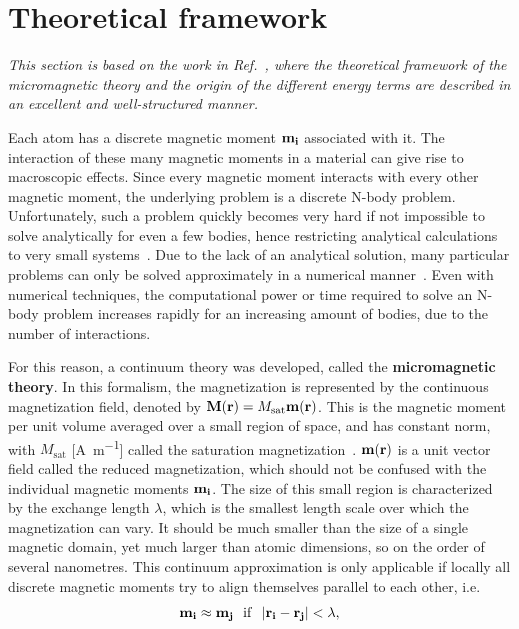 \documentclass[11pt,a4paper,english,twoside]{article}
\begin{document}
\section{Theoretical framework}
\label{par:Physics}
\begin{center}
    \textit{This section is based on the work in Ref.~\cite{abert2013discrete}, where the theoretical framework of the micromagnetic theory and the origin of the different energy terms are described in an excellent and well-structured manner.}
\end{center}
Each atom has a discrete magnetic moment $\vb{m_i}$ associated with it. The interaction of these many magnetic moments in a material can give rise to macroscopic effects. Since every magnetic moment interacts with every other magnetic moment, the underlying problem is a discrete N-body problem. Unfortunately, such a problem quickly becomes very hard if not impossible to solve analytically for even a few bodies, hence restricting analytical calculations to very small systems~\cite{abert2013discrete}. Due to the lack of an analytical solution, many particular problems can only be solved approximately in a numerical manner~\cite{abert2013discrete}. Even with numerical techniques, the computational power or time required to solve an N-body problem increases rapidly for an increasing amount of bodies, due to the number of interactions. \par
For this reason, a continuum theory was developed, called the \textbf{micromagnetic theory}. In this formalism, the magnetization is represented by the continuous magnetization field, denoted by $\vb{M}(\vb{r}) = M_\mathrm{sat} \vb{m}(\vb{r})$. This is the magnetic moment per unit volume averaged over a small region of space, and has constant norm, with $M_\mathrm{sat}$ [\si{\ampere\per\metre}] called the saturation magnetization~\cite{Gilbert1956}. $\vb{m}(\vb{r})$ is a unit vector field called the reduced magnetization, which should not be confused with the individual magnetic moments $\vb{m_i}$.
The size of this small region is characterized by the exchange length $\lambda$, which is the smallest length scale over which the magnetization can vary. It should be much smaller than the size of a single magnetic domain, yet much larger than atomic dimensions, so on the order of several nanometres. This continuum approximation is only applicable if locally all discrete magnetic moments try to align themselves parallel to each other, i.e.
\begin{equation}
    \vb{m_i} \approx \vb{m_j}~~\mathrm{if}~~\abs{\vb{r_i} - \vb{r_j}} < \lambda \mathrm{,}
\end{equation}
\end{document}

